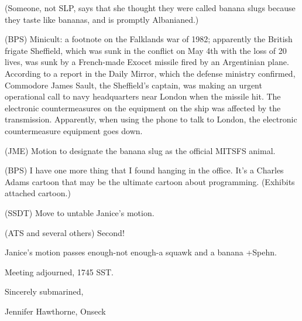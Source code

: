 \documentclass[12pt]{article}
\begin{document}
(Someone, not SLP, says that she thought they were called banana slugs because they taste like bananas, and is promptly Albanianed.)

(BPS) Minicult: a footnote on the Falklands war of 1982; apparently the British frigate Sheffield, which was sunk in the conflict on May 4th with the loss of 20 lives, was sunk by a French-made Exocet missile fired by an Argentinian plane. According to a report in the Daily Mirror, which the defense ministry confirmed, Commodore James Sault, the Sheffield's captain, was making an urgent operational call to navy headquarters near London when the missile hit. The electronic countermeasures on the equipment on the ship was affected by the transmission. Apparently, when using the phone to talk to London, the electronic countermeasure equipment goes down.

(JME) Motion to designate the banana slug as the official MITSFS animal.

(BPS) I have one more thing that I found hanging in the office. It's a Charles Adams cartoon that may be the ultimate cartoon about programming. (Exhibits attached cartoon.)

(SSDT) Move to untable Janice's motion.

(ATS and several others) Second!

Janice's motion passes enough-not enough-a squawk and a banana +Spehn.

\vspace{12pt}

\noindent
Meeting adjourned, 1745 SST.

\vspace{18pt}

\centerline{Sincerely submarined,}
\centerline{Jennifer Hawthorne, Onseck}
\end{document}
